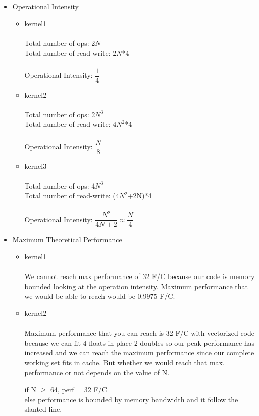 \documentclass[letterpaper, 11pt]{article}
\begin{document}
\begin{itemize}
\item Operational Intensity
\begin{itemize}
\item kernel1 \\ \\
Total number of ops: 2$N$ \\
Total number of read-write: 2$N$*4 \\ \\
Operational Intensity: $\dfrac{1}{4}$ \\
\item kernel2 \\ \\ 
Total number of ops: 2$N^3$ \\
Total number of read-write: 4$N^2$*4 \\ \\
Operational Intensity: $\dfrac{N}{8}$\\
\item kernel3 \\ \\
Total number of ops: 4$N^3$ \\
Total number of read-write: (4$N^2$+2N)*4 \\ \\
Operational Intensity: $\dfrac{N^2}{4N+2} \approx \dfrac{N}{4} $\\
\end{itemize}
\item Maximum Theoretical Performance
\begin{itemize}
\item kernel1 \\ \\
We cannot reach max performance of 32 F/C because our code is memory bounded looking at the operation intensity. Maximum performance that we would be able to reach would be 0.9975 F/C.
\item kernel2 \\ \\
Maximum performance that you can reach is 32 F/C with vectorized code because we can fit 4 floats in place 2 doubles so our peak performance has increased and we can reach the maximum performance since our complete working set fits in cache. But whether we would reach that max. performance or not depends on the value of N.
\begin{center}
if N $\geq$ 64, perf = 32 F/C \\
else performance is bounded by memory bandwidth and it follow the slanted line.

\end{center}
\end{itemize}
\end{itemize}
\end{document}
